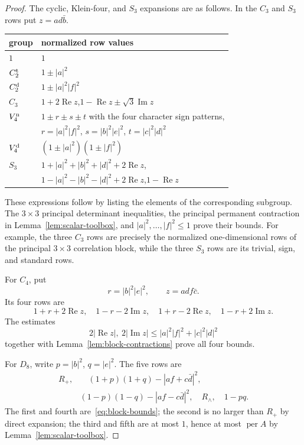 \documentclass[11pt]{article}
\theoremstyle{definition}
\newcommand{\per}{\operatorname{per}}
\newcommand{\Rea}{\operatorname{Re}}
\newcommand{\Ima}{\operatorname{Im}}
\begin{document}
\begin{proof}
The cyclic, Klein-four, and $S_3$ expansions are as follows.  In the $C_3$
and $S_3$ rows put $z=ad\bar b$.
\begin{center}
\begin{tabular}{@{}ll@{}}
\toprule
group & normalized row values\\
\midrule
$1$ & $1$\\
$C_2^{\rm t}$ & $1\pm|a|^2$\\
$C_2^{\rm d}$ & $1\pm|a|^2|f|^2$\\
$C_3$ & $1+2\Rea z$,\quad $1-\Rea z\pm\sqrt3\Ima z$\\
$V_4^{\rm n}$ & $1\pm r\pm s\pm t$ with the four character sign patterns,\\
& $r=|a|^2|f|^2$, $s=|b|^2|e|^2$, $t=|c|^2|d|^2$\\
$V_4^{\rm d}$ & $(1\pm|a|^2)(1\pm|f|^2)$\\
$S_3$ & $1+|a|^2+|b|^2+|d|^2+2\Rea z$,\\
& $1-|a|^2-|b|^2-|d|^2+2\Rea z$,\quad $1-\Rea z$\\
\bottomrule
\end{tabular}
\end{center}
These expressions follow by listing the elements of the corresponding
subgroup.  The $3\times3$ principal determinant inequalities, the principal
permanent contraction in Lemma~\ref{lem:scalar-toolbox}, and
$|a|^2,\ldots,|f|^2\leq1$ prove their bounds.  For example, the three $C_3$
rows are precisely the normalized one-dimensional rows of the principal
$3\times3$ correlation block, while the three $S_3$ rows are its trivial,
sign, and standard rows.

For $C_4$, put
\[
 r=|b|^2|e|^2,\qquad z=adf\bar c.
\]
Its four rows are
\begin{equation}\label{eq:c4-rows}
 1+r+2\Rea z,\quad 1-r-2\Ima z,\quad
 1+r-2\Rea z,\quad 1-r+2\Ima z.
\end{equation}
The estimates
\[
 2|\Rea z|,\ 2|\Ima z|
 \leq |a|^2|f|^2+|c|^2|d|^2
\]
together with Lemma~\ref{lem:block-contractions} prove all four bounds.

For $D_8$, write $p=|b|^2$, $q=|e|^2$.  The five rows are
\begin{align}
 R_+,&\quad
 (1+p)(1+q)-|af+c\bar d|^2,\nonumber\\
 &(1-p)(1-q)-|af-c\bar d|^2,\quad
 R_\wedge,\quad 1-pq.\label{eq:d8-rows}
\end{align}
The first and fourth are~\eqref{eq:block-bounds}; the second is no larger
than $R_+$ by direct expansion; the third and fifth are at most $1$, hence at
most $\per A$ by Lemma~\ref{lem:scalar-toolbox}.


\end{proof}
\end{document}

